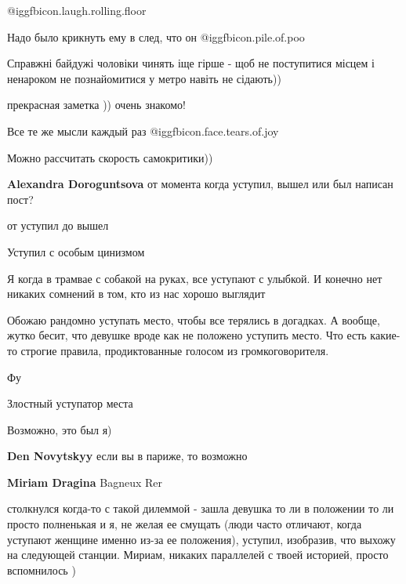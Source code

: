 \begin{itemize}
 @igg{fbicon.laugh.rolling.floor} 

Надо было крикнуть ему в след, что он  @igg{fbicon.pile.of.poo} 

Справжні байдужі чоловіки чинять іще гірше - щоб не поступитися місцем і ненароком не познайомитися у метро навіть не сідають))

прекрасная заметка )) очень знакомо!

Все те же мысли каждый раз  @igg{fbicon.face.tears.of.joy} 

Можно рассчитать скорость самокритики))

\begin{itemize} %
\textbf{Alexandra Doroguntsova} от момента когда уступил, вышел или был написан пост?

от уступил до вышел
\end{itemize} %

Уступил с особым цинизмом

Я когда в трамвае с собакой на руках, все уступают с улыбкой.
И конечно нет никаких сомнений в том, кто из нас хорошо выглядит


Обожаю рандомно уступать место, чтобы все терялись в догадках. А вообще, жутко
бесит, что девушке вроде как не положено уступить место. Что есть какие-то
строгие правила, продиктованные голосом из громкоговорителя.

Фу

Злостный уступатор места

Возможно, это был я)

\begin{itemize} %
\textbf{Den Novytskyy} если вы в париже, то возможно

\textbf{Miriam Dragina} Bagneux Rer
\end{itemize} %


столкнулся когда-то с такой дилеммой - зашла девушка то ли в положении то ли
просто полненькая и я, не желая ее смущать (люди часто отличают, когда уступают
женщине именно из-за ее положения), уступил, изобразив, что выхожу на следующей
станции. Мириам, никаких параллелей с твоей историей, просто вспомнилось )


\end{itemize}
